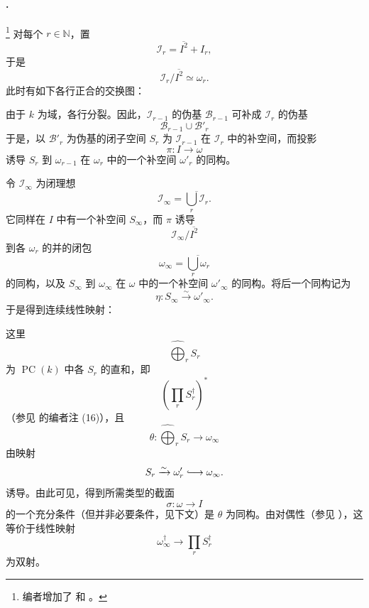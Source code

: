 
\paragraph{.}
\label{sga3:VIIB:5.2.1.A}
\footnote{\label{sga3:VIIB:nde:155}编者增加了  和 。}
对每个 \(r\in\mathbb N\)，置
\[
  \mathcal I_r=\overline{I^2}+I_r,
\]
于是
\[
  \mathcal I_r/\overline{I^2}\simeq\omega_r.
\]
此时有如下各行正合的交换图：
\begin{center}
  \label{sga3:VIIB:5.2.1.A:exact-rows}
  
\end{center}

由于 \(k\) 为域，各行分裂。因此，\(\mathcal I_{r-1}\) 的伪基 \(\mathscr B_{r-1}\) 可补成 \(\mathcal I_r\) 的伪基
\[
  \mathscr B_{r-1}\cup\mathscr B'_r
\]
于是，以 \(\mathscr B'_r\) 为伪基的闭子空间 \(S_r\) 为 \(\mathcal I_{r-1}\) 在 \(\mathcal I_r\) 中的补空间，而投影
\[
  \pi:I\longrightarrow\omega
\]
诱导 \(S_r\) 到 \(\omega_{r-1}\) 在 \(\omega_r\) 中的一个补空间 \(\omega'_r\) 的同构。

令 \(\mathcal I_\infty\) 为闭理想
\[
  \mathcal I_\infty
  =
  \overline{\bigcup_r\mathcal I_r}.
\]
它同样在 \(I\) 中有一个补空间 \(S_\infty\)，而 \(\pi\) 诱导
\[
  \mathcal I_\infty/\overline{I^2}
\]
到各 \(\omega_r\) 的并的闭包
\[
  \omega_\infty
  =
  \overline{\bigcup_r\omega_r}
\]
的同构，以及 \(S_\infty\) 到 \(\omega_\infty\) 在 \(\omega\) 中的一个补空间 \(\omega'_\infty\) 的同构。将后一个同构记为
\[
  \eta:S_\infty\xrightarrow{\sim}\omega'_\infty.
\]
于是得到连续线性映射：
\begin{center}
  \label{sga3:VIIB:5.2.1.A:splitting-maps}
  
\end{center}

这里
\[
  \widehat{\bigoplus}_r S_r
\]
为 \(\operatorname{PC}(k)\) 中各 \(S_r\) 的直和，即
\[
  \left(\prod_r S_r^\dagger\right)^*
\]
\textup{（参见  的编者注 \textup{(16)}）}，且
\[
  \theta:
  \widehat{\bigoplus}_r S_r
  \longrightarrow\omega_\infty
\]
由映射
\[
  S_r\xrightarrow{\sim}\omega'_r
  \lhook\joinrel\longrightarrow\omega_\infty.
\]
诱导。由此可见，得到所需类型的截面
\[
  \sigma:\omega\longrightarrow I
\]
的一个充分条件\textup{（但并非必要条件，见下文）}是 \(\theta\) 为同构。由对偶性\textup{（参见 ）}，这等价于线性映射
\[
  \omega_\infty^\dagger
  \longrightarrow
  \prod_r S_r^\dagger
\]
为双射。
